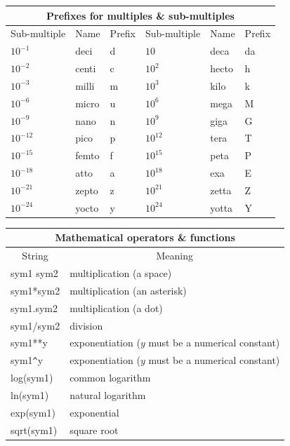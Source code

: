 \documentclass[twoside,11pt,nolof]{starlink}
\begin{document}
\begin{center}
\begin{tabular}{|lll|lll|}
\hline
\multicolumn{6}{|c|}{{\large Prefixes for multiples \&
sub-multiples}} \\ \hline
\multicolumn{1}{|c}{Sub-multiple} & \multicolumn{1}{c}{Name} &
\multicolumn{1}{c|}{Prefix} &
\multicolumn{1}{|c}{Sub-multiple} & \multicolumn{1}{c}{Name} &
\multicolumn{1}{c|}{Prefix} \\ \hline
$10^{-1}$ & deci & d & $10$ & deca & da \\
$10^{-2}$ & centi & c & $10^{2}$ & hecto & h \\
$10^{-3}$ & milli & m & $10^{3}$ & kilo & k \\
$10^{-6}$ & micro & u & $10^{6}$ & mega & M \\
$10^{-9}$ & nano & n & $10^{9}$ & giga & G \\
$10^{-12}$ & pico & p & $10^{12}$ & tera & T \\
$10^{-15}$ & femto & f & $10^{15}$ & peta & P \\
$10^{-18}$ & atto & a & $10^{18}$ & exa & E \\
$10^{-21}$ & zepto & z & $10^{21}$ & zetta & Z \\
$10^{-24}$ & yocto & y & $10^{24}$ & yotta & Y \\
\hline
\end{tabular}
\end{center}

\begin{center}
\begin{tabular}{|l|l|}
\hline
\multicolumn{2}{|c|}{{\large Mathematical operators \& functions}} \\
\hline
\multicolumn{1}{|c|}{String} & \multicolumn{1}{|c|}{Meaning} \\ \hline
sym1 sym2           & multiplication (a space) \\
sym1*sym2           & multiplication (an asterisk) \\
sym1.sym2           & multiplication (a dot) \\
sym1/sym2           & division \\
sym1**y             & exponentiation ($y$ must be a numerical constant)\\
sym1\verb+^+y       & exponentiation ($y$ must be a numerical constant)\\
log(sym1)           & common logarithm \\
ln(sym1)            & natural logarithm \\
exp(sym1)           & exponential \\
sqrt(sym1)          & square root \\
\hline
\end{tabular}
\end{center}
\end{document}
